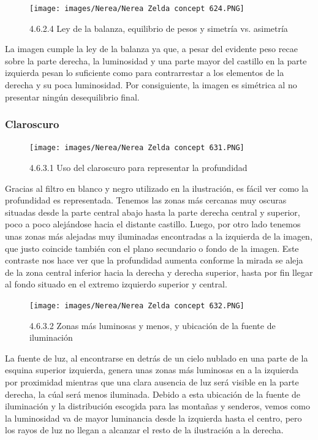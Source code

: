 \documentclass[12pt]{article}
\begin{document}
    \begin{figure}[H]
      \centering
      \texttt{[image: images/Nerea/Nerea Zelda concept 624.PNG]}
      \caption{\small 4.6.2.4 Ley de la balanza, equilibrio de pesos y simetría vs. asimetría}
    \end{figure}

    La imagen cumple la ley de la balanza ya que, a pesar del evidente peso recae sobre la parte derecha, la luminosidad y una parte mayor del castillo en la parte izquierda pesan lo suficiente como para contrarrestar a los elementos de la derecha y su poca luminosidad. Por consiguiente, la imagen es simétrica al no presentar ningún desequilibrio final.


        \subsubsection{Claroscuro}

        
    \begin{figure}[H]
      \centering
      \texttt{[image: images/Nerea/Nerea Zelda concept 631.PNG]}
      \caption{\small 4.6.3.1 Uso del claroscuro para representar la profundidad}
    \end{figure}

    Gracias al filtro en blanco y negro utilizado en la ilustración, es fácil ver como la profundidad es representada. Tenemos las zonas más cercanas muy oscuras situadas desde la parte central abajo hasta la parte derecha central y superior, poco a poco alejándose hacia el distante castillo. Luego, por otro lado tenemos unas zonas más alejadas muy iluminadas encontradas a la izquierda de la imagen, que justo coincide también con el plano secundario o fondo de la imagen. Este contraste nos hace ver que la profundidad aumenta conforme la mirada se aleja de la zona central inferior hacia la derecha y derecha superior, hasta por fin llegar al fondo situado en el extremo izquierdo superior y central.

    \begin{figure}[H]
      \centering
      \texttt{[image: images/Nerea/Nerea Zelda concept 632.PNG]}
      \caption{\small 4.6.3.2 Zonas más luminosas y menos, y ubicación de la fuente de iluminación}
    \end{figure}

    La fuente de luz, al encontrarse en detrás de un cielo nublado en una parte de la esquina superior izquierda, genera unas zonas más luminosas en a la izquierda por proximidad mientras que una clara ausencia de luz será visible en la parte derecha, la cúal será menos iluminada. Debido a esta ubicación de la fuente de iluminación y la distribución escogida para las montañas y senderos, vemos como la luminosidad va de mayor luminancia desde la izquierda hasta el centro, pero los rayos de luz no llegan a alcanzar el resto de la ilustración a la derecha.
\end{document}
